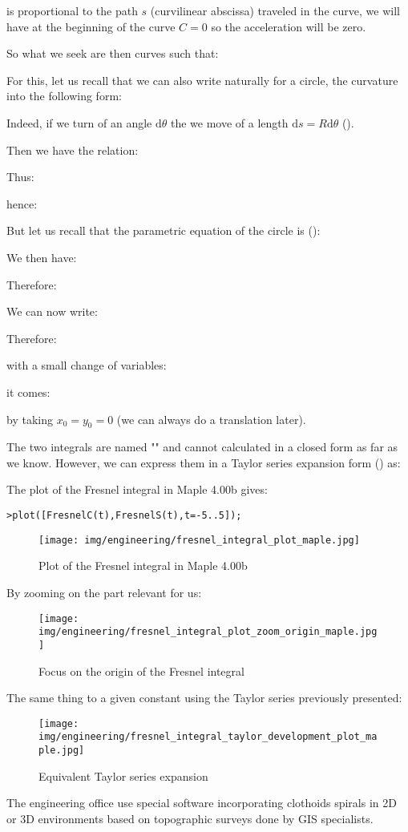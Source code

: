 	is proportional to the path $s$ (curvilinear abscissa) traveled in the curve, we will have at the beginning of the curve $C=0$ so the acceleration will be zero.

	So what we seek are then curves such that:
	
	For this, let us recall that we can also write naturally for a circle, the curvature into the following form:
	
	Indeed, if we turn of an angle $\mathrm{d}\theta$ the we move of a length $\mathrm{d}s=R\mathrm{d}\theta$ ().

	Then we have the relation:
	
	Thus:
	
	hence:
	
	But let us recall that the parametric equation of the circle is ():
	
	We then have:
	
	Therefore:
	
	We can now write:
	
	Therefore:
	
	with a small change of variables:
	
	it comes:
	
	by taking $x_0=y_0=0$ (we can always do a translation later).
	
	The two integrals are named "" and cannot calculated in a closed form as far as we know. However, we can express them in a Taylor series expansion form () as:
	
	The plot of the Fresnel integral in Maple 4.00b gives:
	
	\texttt{>plot([FresnelC(t),FresnelS(t),t=-5..5]);}
	\begin{figure}[H]
		\centering
		\texttt{[image: img/engineering/fresnel\_integral\_plot\_maple.jpg]}
		\caption{Plot of the Fresnel integral in Maple 4.00b}
	\end{figure}
	By zooming on the part relevant for us:
	\begin{figure}[H]
		\centering
		\texttt{[image: img/engineering/fresnel\_integral\_plot\_zoom\_origin\_maple.jpg]}
		\caption[]{Focus on the origin of the Fresnel integral}
	\end{figure}
	The same thing to a given constant using the Taylor series previously presented:
	\begin{figure}[H]
		\centering
		\texttt{[image: img/engineering/fresnel\_integral\_taylor\_development\_plot\_maple.jpg]}
		\caption[]{Equivalent Taylor series expansion}
	\end{figure}
	The engineering office use special software incorporating clothoids spirals in 2D or 3D environments based on topographic surveys done by GIS specialists.
	
